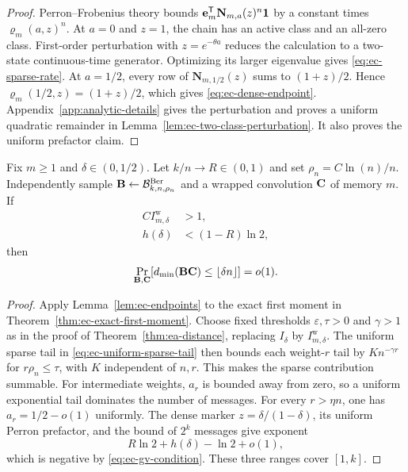 \begin{proof}
Perron--Frobenius theory bounds
$\mathbf e_m^{\mathsf T}\mathbf N_{m,a}(z)^n\mathbf 1$ by a constant times
$\varrho_m(a,z)^n$.  At $a=0$ and $z=1$, the chain has an active class and an
all-zero class.  First-order perturbation with $z=e^{-\theta a}$ reduces the
calculation to a two-state continuous-time generator.  Optimizing its larger
eigenvalue gives \eqref{eq:ec-sparse-rate}.  At $a=1/2$, every row of
$\mathbf N_{m,1/2}(z)$ sums to $(1+z)/2$.  Hence
$\varrho_m(1/2,z)=(1+z)/2$, which gives
\eqref{eq:ec-dense-endpoint}.  Appendix~\ref{app:analytic-details} gives the
perturbation and proves a uniform quadratic remainder in
Lemma~\ref{lem:ec-two-class-perturbation}.  It also proves the uniform
prefactor claim.
\end{proof}

\begin{theorem}
\label{thm:ec-distance}
Fix $m\geq1$ and $\delta\in(0,1/2)$.  Let $k/n\to R\in(0,1)$ and set
$\rho_n=C\ln(n)/n$.  Independently sample
$\mathbf B\gets\mathcal B^{\mathrm{Ber}}_{k,n,\rho_n}$ and a wrapped convolution
$\mathbf C$ of memory $m$.  If
\begin{align}
 C I^{\mathrm w}_{m,\delta}&>1,
 \label{eq:ec-sparse-condition}\\
 h(\delta)&<(1-R)\ln2,
 \label{eq:ec-gv-condition}
\end{align}
then
\begin{equation}
 \Pr_{\mathbf B,\mathbf C}[d_{\min}(\mathbf B\mathbf C)\leq\lfloor\delta n\rfloor]=o(1).
 \label{eq:ec-distance-conclusion}
\end{equation}
\end{theorem}

\begin{proof}
Apply Lemma~\ref{lem:ec-endpoints} to the exact first moment in
Theorem~\ref{thm:ec-exact-first-moment}.  Choose fixed thresholds
$\varepsilon,\tau>0$ and $\gamma>1$ as in the proof of
Theorem~\ref{thm:ea-distance}, replacing $I_\delta$ by
$I^{\mathrm w}_{m,\delta}$.  The uniform sparse tail in
\eqref{eq:ec-uniform-sparse-tail} then bounds each weight-$r$ tail by
$K n^{-\gamma r}$ for $r\rho_n\leq\tau$, with $K$ independent of $n,r$.
This makes the sparse contribution summable.  For intermediate weights, $a_r$ is
bounded away from zero, so a uniform exponential tail dominates the number
of messages.  For every $r>\eta n$, one has $a_r=1/2-o(1)$ uniformly.  The
dense marker $z=\delta/(1-\delta)$, its uniform Perron prefactor, and the
bound of $2^k$ messages give exponent
\[
 R\ln2+h(\delta)-\ln2+o(1),
\]
which is negative by \eqref{eq:ec-gv-condition}.  These three ranges cover
$[1,k]$.
\end{proof}

